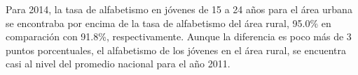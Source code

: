 Para 2014, la tasa de alfabetismo en jóvenes de 15 a 24 años para el área urbana se encontraba por encima de la tasa de alfabetismo del área rural, 95.0\% en comparación con 91.8\%, respectivamente. Aunque la diferencia es poco más de 3 puntos porcentuales, el alfabetismo de los jóvenes en el área rural, se encuentra casi al nivel del promedio nacional para el año 2011.    